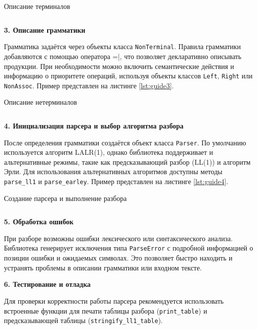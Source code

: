 \documentclass[14pt, russian]{scrartcl}
\begin{document}
\begin{listing}[H]
	\caption{Описание терминалов}
	\label{lst:guide2}
	\inputminted[style=bw, frame=single,fontsize = \footnotesize, linenos=false, xleftmargin = 1.5em]{python}{./listings/guide/2.py}
\end{listing}

\textbf{3. Описание грамматики}

Грамматика задаётся через объекты класса \texttt{NonTerminal}. Правила грамматики добавляются с помощью
оператора \verb||=|, что позволяет декларативно описывать продукции. При необходимости можно включить
семантические действия и информацию о приоритете операций, используя объекты классов
\texttt{Left}, \texttt{Right} или \texttt{NonAssoc}. Пример представлен на листинге \ref{lst:guide3}.

\begin{listing}[H]
	\caption{Описание нетерминалов}
	\label{lst:guide3}
	\inputminted[style=bw, frame=single,fontsize = \footnotesize, linenos=false, xleftmargin = 1.5em]{python}{./listings/guide/3.py}
\end{listing}

\textbf{4. Инициализация парсера и выбор алгоритма разбора}

После определения грамматики создаётся объект класса \texttt{Parser}. По умолчанию используется алгоритм LALR(1),
однако библиотека поддерживает и альтернативные режимы, такие как предсказывающий разбор (LL(1)) и
алгоритм Эрли. Для использования альтернативных алгоритмов доступны методы \texttt{parse\_ll1} и
\texttt{parse\_earley}. Пример представлен на листинге \ref{lst:guide4}.

\begin{listing}[H]
	\caption{Создание парсера и выполнение разбора}
	\label{lst:guide4}
	\inputminted[style=bw, frame=single,fontsize = \footnotesize, linenos=false, xleftmargin = 1.5em]{python}{./listings/guide/4.py}
\end{listing}

\textbf{5. Обработка ошибок}

При разборе возможны ошибки лексического или синтаксического анализа. Библиотека генерирует
исключения типа \texttt{ParseError} с подробной информацией о позиции ошибки и ожидаемых символах.
Это позволяет быстро находить и устранять проблемы в описании грамматики или входном тексте.

\textbf{6. Тестирование и отладка}

Для проверки корректности работы парсера рекомендуется использовать встроенные функции для печати таблицы разбора
(\texttt{print\_table}) и предсказывающей таблицы (\texttt{stringify\_ll1\_table}).
\end{document}
